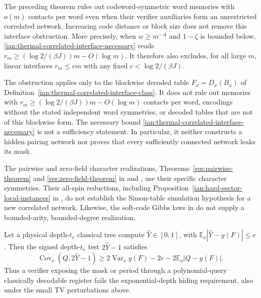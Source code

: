 \begin{remark}
\label{ian:thermal-correlated-interface-scope}
The preceding theorem rules out codeword-symmetric word memories
with \(o(m)\) contacts per word even when their verifier auxiliaries
form an unrestricted correlated network. Increasing code distance
or block size does not remove this interface obstruction.
More precisely, when \(w\ge m^{-A}\) and \(1-\zeta\) is bounded
below, \eqref{ian:thermal-correlated-interface-necessary} reads
\(r_m\ge(\log2/(\beta J))m-O(\log m)\). It therefore also excludes,
for all large \(m\), linear interfaces \(r_m\le cm\) with any fixed
\(c<\log2/(\beta J)\).

The obstruction applies only to the blockwise decoded table
\(F_x=D_x(B_x)\) of
Definition~\ref{ian:thermal-correlated-interface-class}. It does not
rule out memories with \(r_m\ge(\log2/(\beta J))m-O(\log m)\)
contacts per word, encodings without the stated independent word
symmetries, or decoded tables that are not of this blockwise form.
The necessary bound \eqref{ian:thermal-correlated-interface-necessary}
is not a sufficiency statement. In particular, it neither constructs
a hidden pairing network nor proves that every sufficiently connected
network leaks its mask.

The pairwise and zero-field character realizations,
Theorems~\ref{res:pairwise-theorem} and
\ref{res:zero-field-theorem} in
 and
,
use their specific character symmetries.
Their all-spin reductions, including
Proposition~\ref{ian:hard-sector-local-instances} in
, do not establish the
Simon-table simulation hypothesis for a new correlated network.
Likewise, the soft-code Gibbs laws in
do not supply a bounded-arity, bounded-degree realization.
\end{remark}

\begin{lemma}
\label{ian:thermal-robust-verifier-leakage}
Let a physical depth-\(t_{\mathrm v}\) classical tree compute
\(\widehat Y\in[0,1]\), with
\(\mathbb E_\nu|\widehat Y-y(F)|\le e\).
Then the signed depth-\(t_{\mathrm v}\) test \(2\widehat Y-1\)
satisfies
\[
 \operatorname{Cov}_\nu(Q,2\widehat Y-1)
 \ge
 2\operatorname{Var}_\nu y(F)
       -2e-2\mathbb E_\nu|Q-y(F)|.
 \tag{38.23}
\]
Thus a verifier exposing the mask or period through a polynomial-query
classically decodable register fails the exponential-depth hiding
requirement, also under the small TV perturbations above.
\end{lemma}

